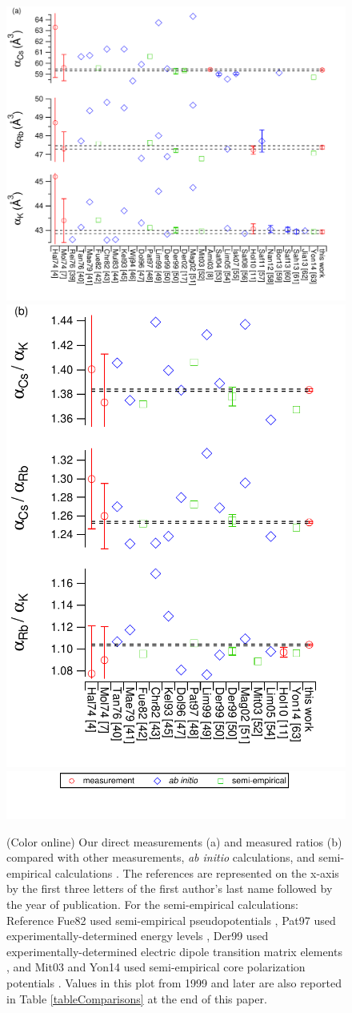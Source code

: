 \documentclass[twocolumn,pra,showpacs,superscriptaddress,longbibliography]{revtex4-1}   %
\begin{document}
\begin{figure}
\includegraphics[width=0.60\linewidth,keepaspectratio]{displayAbsComps.pdf}
\includegraphics[width=0.38\linewidth,keepaspectratio]{displayRatComps.pdf}
\includegraphics[width=0.55\linewidth,keepaspectratio]{displayCompsLegend.pdf}
\caption{\label{comparisons}(Color online) Our direct measurements (a) and measured ratios (b) compared with other measurements, \textit{ab initio} calculations, and semi-empirical calculations 
\cite{Hall1974,Molof1974a,Reinsch1976,Tang1976,Kutzelnigg1978,
Fuentealba1999,Christiansen1982,Muller1984,Kello1993,VanWijngaarden1994,
Dolg1996,Patil1997,Lim1999,Derevianko1998,Magnier2002,Derevianko2001,
Mitroy2003,Amini2003,Safronova2004,Lim2005,Iskrenova-Tchoukova2007,Safronova2008,
Holmgren2010,Safronova2011,Nandy2012,Borschevsky2013,Safronova2013,Sahoo2013,Jiang2013,
Safronova2013,Y.-B.2014}.
The references are represented on the x-axis by the first three letters of the first author's last name followed by the year of publication. For the semi-empirical calculations: Reference Fue82 used semi-empirical pseudopotentials \cite{Fuentealba1999}, Pat97 used experimentally-determined energy levels \cite{Patil1997}, Der99 used experimentally-determined electric dipole transition matrix elements \cite{Derevianko1998}, and Mit03 and Yon14 used semi-empirical core polarization potentials \cite{Mitroy2003,Y.-B.2014}. Values in this plot from 1999 and later are also reported in Table \ref{tableComparisons} at the end of this paper.}
\end{figure}
\end{document}
